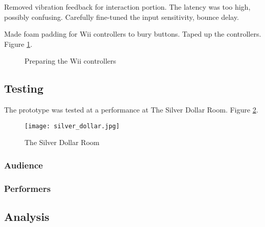 Removed vibration feedback for interaction portion. The latency was too high, possibly confusing. Carefully fine-tuned the input sensitivity, bounce delay.

Made foam padding for Wii controllers to bury buttons. Taped up the controllers. Figure \ref{prototyping3.7}.

\begin{figure}[t]
	\centering

	\hspace{0.1cm}

	\caption{Preparing the Wii controllers}

	\label{prototyping3.7}
\end{figure}

\subsection{Testing}

The prototype was tested at a performance at The Silver Dollar Room. Figure \ref{prototyping3.8}.

\begin{figure}[t]
	\centering

	\texttt{[image: silver\_dollar.jpg]}
	\caption{The Silver Dollar Room}

	\label{prototyping3.8}
\end{figure}

\subsubsection{Audience}

\subsubsection{Performers}

\subsection{Analysis}


